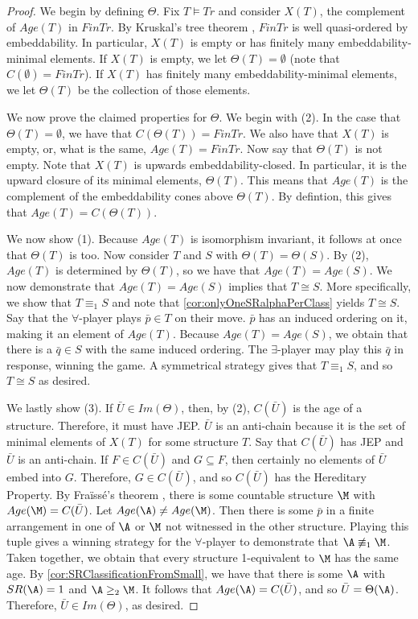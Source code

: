 \documentclass{amsart}
\renewcommand{\-}{\text{-}}
\begin{document}
\begin{proof}
We begin by defining $\Theta$.
Fix $T\models Tr$ and consider $X(T)$, the complement of $Age(T)$ in $FinTr$.
By Kruskal's tree theorem \cite{Kru60}, $FinTr$ is well quasi-ordered by embeddability.
In particular, $X(T)$ is empty or has finitely many embeddability-minimal elements.
If $X(T)$ is empty, we let $\Theta(T)=\emptyset$ (note that $C(\emptyset)=FinTr$).
If $X(T)$ has finitely many embeddability-minimal elements, we let $\Theta(T)$ be the collection of those elements.

We now prove the claimed properties for $\Theta$.
We begin with (2).
In the case that $\Theta(T)=\emptyset$, we have that $C(\Theta(T))=FinTr$.
We also have that $X(T)$ is empty, or, what is the same, $Age(T)=FinTr$.
Now say that $\Theta(T)$ is not empty.
Note that $X(T)$ is upwards embeddability-closed.
In particular, it is the upward closure of its minimal elements, $\Theta(T)$.
This means that $Age(T)$ is the complement of the embeddability cones above $\Theta(T)$.
By defintion, this gives that $Age(T)= C(\Theta(T))$.

We now show (1).
Because $Age(T)$ is isomorphism invariant, it follows at once that $\Theta(T)$ is too.
Now consider $T$ and $S$ with $\Theta(T)=\Theta(S)$.
By (2), $Age(T)$ is determined by $\Theta(T)$, so we have that $Age(T)=Age(S)$.
We now demonstrate that $Age(T)=Age(S)$ implies that $T\cong S$.
More specifically, we show that $T\equiv_1S$ and note that \cref{cor:onlyOneSRalphaPerClass} yields $T\cong S$.
Say that the $\forall$-player plays $\bar{p}\in T$ on their move.
$\bar{p}$ has an induced ordering on it, making it an element of $Age(T)$.
Because $Age(T)=Age(S)$, we obtain that there is a $\bar{q}\in S$ with the same induced ordering.
The $\exists$-player may play this $\bar{q}$ in response, winning the game.
A symmetrical strategy gives that $T\equiv_1S$, and so $T\cong S$ as desired.

We lastly show (3).
If $\bar{U}\in Im(\Theta)$, then, by (2), $C(\bar{U})$ is the age of a structure.
Therefore, it must have JEP.
$\bar{U}$ is an anti-chain because it is the set of minimal elements of $X(T)$ for some structure $T$.
Say that $C(\bar{U})$ has JEP and $\bar{U}$ is an anti-chain.
If $F\in C(\bar{U})$ and $G\subseteq F$, then certainly no elements of $\bar{U}$ embed into $G$.
Therefore, $G\in C(\bar{U})$, and so $C(\bar{U})$ has the Hereditary Property.
By Fraïssé's theorem \cite[Chapter 7.1]{Hod93}, there is some countable structure $\M$ with $Age(\M)=C(\bar{U})$.
Let $Age(\A)\neq Age(\M)$.
Then there is some $\bar{p}$ in a finite arrangement in one of $\A$ or $\M$ not witnessed in the other structure.
Playing this tuple gives a winning strategy for the $\forall$-player to demonstrate that $\A\not\equiv_1\M$.
Taken together, we obtain that every structure 1-equivalent to $\M$ has the same age.
By \cref{cor:SRClassificationFromSmall}, we have that there is some $\A$ with $SR(\A)=1$ and $\A\geq_2 \M$.
It follows that $Age(\A)=C(\bar{U})$, and so $\bar{U}=\Theta(\A)$.
Therefore, $\bar{U}\in Im(\Theta)$, as desired.
\end{proof}
\end{document}
